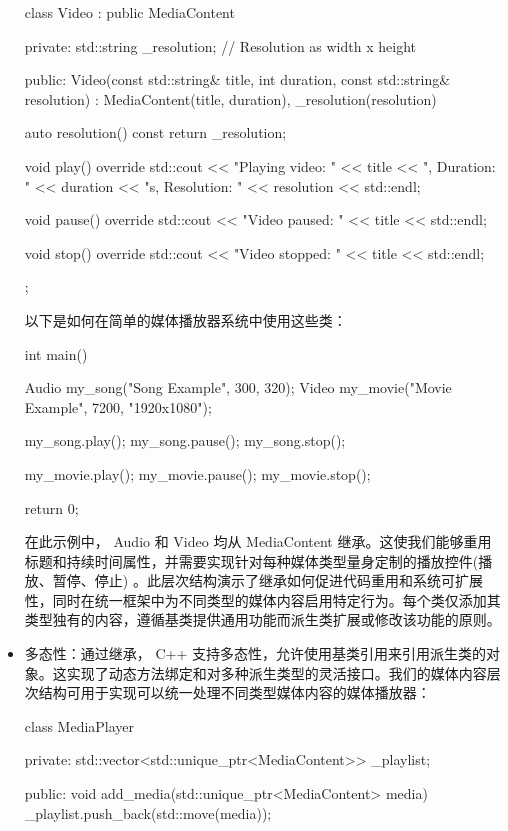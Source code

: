 \begin{itemize}
\begin{cpp}
class Video : public MediaContent {
private:
    std::string _resolution; // Resolution as width x height

public:
    Video(const std::string& title, int duration, const
    std::string& resolution)
        : MediaContent(title, duration), _resolution(resolution)
    {}

    auto resolution() const { return _resolution; }

    void play() override {
        std::cout << "Playing video: " << title << ", Duration: " << duration << "s, Resolution: " << resolution << std::endl;
    }

    void pause() override {
        std::cout << "Video paused: " << title << std::endl;
    }

    void stop() override {
        std::cout << "Video stopped: " << title << std::endl;
    }
};
\end{cpp}

以下是如何在简单的媒体播放器系统中使用这些类：

\begin{cpp}
int main() {
    Audio my_song("Song Example", 300, 320);
    Video my_movie("Movie Example", 7200, "1920x1080");

    my_song.play();
    my_song.pause();
    my_song.stop();

    my_movie.play();
    my_movie.pause();
    my_movie.stop();

    return 0;
}
\end{cpp}

在此示例中， Audio 和 Video 均从 MediaContent 继承。这使我们能够重用标题和持续时间属性，并需要实现针对每种媒体类型量身定制的播放控件(播放、暂停、停止) 。此层次结构演示了继承如何促进代码重用和系统可扩展性，同时在统一框架中为不同类型的媒体内容启用特定行为。每个类仅添加其类型独有的内容，遵循基类提供通用功能而派生类扩展或修改该功能的原则。

\item
多态性：通过继承， C++ 支持多态性，允许使用基类引用来引用派生类的对象。这实现了动态方法绑定和对多种派生类型的灵活接口。我们的媒体内容层次结构可用于实现可以统一处理不同类型媒体内容的媒体播放器：

\begin{cpp}
class MediaPlayer {
private:
    std::vector<std::unique_ptr<MediaContent>> _playlist;

public:
    void add_media(std::unique_ptr<MediaContent> media) {
        _playlist.push_back(std::move(media));
    }

}
\end{cpp}
\end{itemize}
